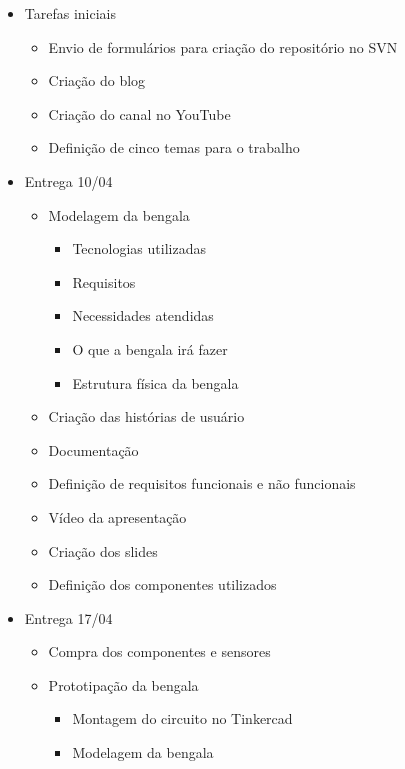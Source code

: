     \begin{itemize}
        \item Tarefas iniciais
        \begin{itemize} 
            \item Envio de formulários para criação do repositório no SVN
            \item Criação do blog 
            \item Criação do canal no YouTube
            \item Definição de cinco temas para o trabalho
        \end{itemize}
        \item Entrega 10/04
        \begin{itemize}
            \item Modelagem da bengala
            \begin{itemize}
                \item Tecnologias utilizadas
                \item Requisitos
                \item Necessidades atendidas
                \item O que a bengala irá fazer
                \item Estrutura física da bengala
            \end{itemize}
            \item Criação das histórias de usuário
            \item Documentação
            \item Definição de requisitos funcionais e não funcionais
            \item Vídeo da apresentação
            \item Criação dos slides
            \item Definição dos componentes utilizados
        \end{itemize}
        \item Entrega 17/04
        \begin{itemize}
            \item Compra dos componentes e sensores
            \item Prototipação da bengala 
                \begin{itemize}
                    \item Montagem do circuito no Tinkercad
                    \item Modelagem da bengala 
                \end{itemize}

\end{itemize}
\end{itemize}
